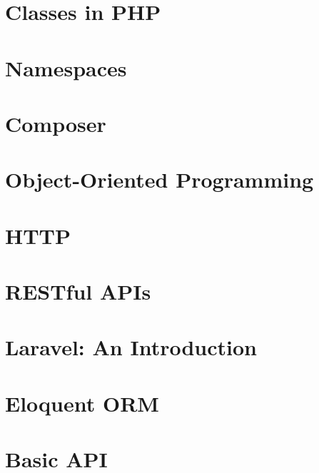 \documentclass[b5paper,openany]{book}
\begin{document}
\tp


\tableofcontents



\chapter{Classes in PHP}


\chapter{Namespaces}


\chapter{Composer}


\chapter{Object-Oriented Programming}


\chapter{HTTP}


\chapter{RESTful APIs}


\chapter{Laravel: An Introduction}


\chapter{Eloquent ORM}


\chapter{Basic API}

\end{document}
